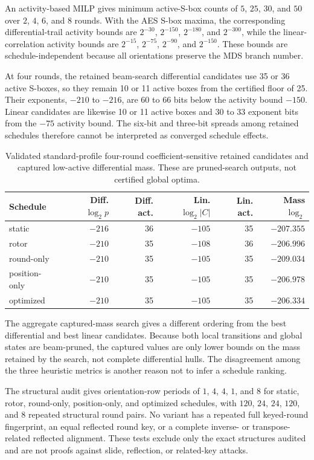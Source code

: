 \documentclass[cryptography,supfile,submit,oneauthor]{Definitions/mdpi}
\begin{document}
An activity-based MILP gives minimum active-S-box counts of $5$, $25$, $30$, and $50$ over $2$, $4$, $6$, and $8$ rounds. With the AES S-box maxima, the corresponding differential-trail activity bounds are $2^{-30}$, $2^{-150}$, $2^{-180}$, and $2^{-300}$, while the linear-correlation activity bounds are $2^{-15}$, $2^{-75}$, $2^{-90}$, and $2^{-150}$. These bounds are schedule-independent because all orientations preserve the MDS branch number.

At four rounds, the retained beam-search differential candidates use 35 or 36 active S-boxes, so they remain 10 or 11 active boxes from the certified floor of 25. Their exponents, $-210$ to $-216$, are 60 to 66 bits below the activity bound $-150$. Linear candidates are likewise 10 or 11 active boxes and 30 to 33 exponent bits from the $-75$ activity bound. The six-bit and three-bit spreads among retained schedules therefore cannot be interpreted as converged schedule effects.

\begin{table}[h]
\centering\small
\caption{Validated standard-profile four-round coefficient-sensitive retained candidates and captured low-active differential mass. These are pruned-search outputs, not certified global optima.}
\begin{tabular}{lrrrrr}
\toprule
Schedule & Diff. $\log_2 p$ & Diff. act. & Lin. $\log_2|C|$ & Lin. act. & Mass $\log_2$\\
\midrule
static & $-216$ & 36 & $-105$ & 35 & $-207.355$\\
rotor & $-210$ & 35 & $-108$ & 36 & $-206.996$\\
round-only & $-210$ & 35 & $-105$ & 35 & $-209.034$\\
position-only & $-210$ & 35 & $-105$ & 35 & $-206.978$\\
optimized & $-210$ & 35 & $-105$ & 35 & $-206.334$\\
\bottomrule
\end{tabular}
\end{table}

The aggregate captured-mass search gives a different ordering from the best differential and best linear candidates. Because both local transitions and global states are beam-pruned, the captured values are only lower bounds on the mass retained by the search, not complete differential hulls. The disagreement among the three heuristic metrics is another reason not to infer a schedule ranking.

The structural audit gives orientation-row periods of $1$, $4$, $4$, $1$, and $8$ for static, rotor, round-only, position-only, and optimized schedules, with $120$, $24$, $24$, $120$, and $8$ repeated structural round pairs. No variant has a repeated full keyed-round fingerprint, an equal reflected round key, or a complete inverse- or transpose-related reflected alignment. These tests exclude only the exact structures audited and are not proofs against slide, reflection, or related-key attacks.
\end{document}
